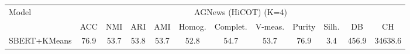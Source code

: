 \begin{tabular}{lccccccccccc}
\toprule
Model & \multicolumn{11}{c}{AGNews (HiCOT) (K=4)} \\
 & ACC & NMI & ARI & AMI & Homog. & Complet. & V-meas. & Purity & Silh. & DB & CH \\
\midrule
SBERT+KMeans & 76.9 & 53.7 & 53.8 & 53.7 & 52.8 & 54.7 & 53.7 & 76.9 & 3.4 & 456.9 & 34638.6 \\
\bottomrule
\end{tabular}
